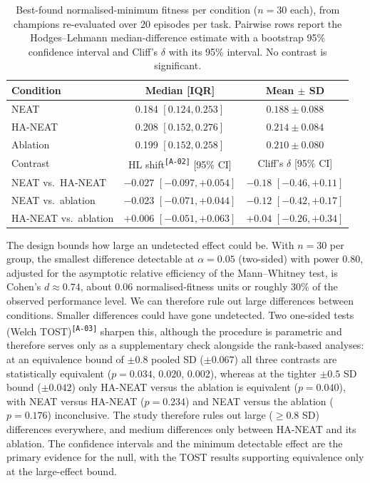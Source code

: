 \documentclass[12pt]{article}
\newcommand{\revID}[1]{\textsuperscript{\scriptsize\texttt{[#1]}}}
\newcommand{\revAcro}[2]{\textcolor{lrPurple}{#2}\revID{#1}}    %
\begin{document}
\begin{table}[h]
\centering
\caption{Best-found normalised-minimum fitness per condition ($n = 30$ each), from champions re-evaluated over 20 episodes per task. Pairwise rows report the Hodges--Lehmann median-difference estimate with a bootstrap 95\% confidence interval and Cliff's $\delta$ with its 95\% interval. No contrast is significant.}
\label{tab:main-fitness}
\begin{tabular}{lcc}
\toprule
Condition & Median [IQR] & Mean $\pm$ SD \\
\midrule
NEAT & 0.184 $[0.124, 0.253]$ & $0.188 \pm 0.088$ \\
HA-NEAT & 0.208 $[0.152, 0.276]$ & $0.214 \pm 0.084$ \\
Ablation & 0.199 $[0.152, 0.258]$ & $0.210 \pm 0.080$ \\
\midrule
Contrast & \revAcro{A-02}{HL shift} [95\% CI] & Cliff's $\delta$ [95\% CI] \\
\midrule
NEAT vs.\ HA-NEAT & $-0.027$ $[-0.097, +0.054]$ & $-0.18$ $[-0.46, +0.11]$ \\
NEAT vs.\ ablation & $-0.023$ $[-0.071, +0.044]$ & $-0.12$ $[-0.42, +0.17]$ \\
HA-NEAT vs.\ ablation & $+0.006$ $[-0.051, +0.063]$ & $+0.04$ $[-0.26, +0.34]$ \\
\bottomrule
\end{tabular}
\end{table}

The design bounds how large an undetected effect could be.
With $n = 30$ per group, the smallest difference detectable at $\alpha = 0.05$ (two-sided) with power 0.80, adjusted for the asymptotic relative efficiency of the Mann--Whitney test, is Cohen's $d \approx 0.74$, about 0.06 normalised-fitness units or roughly 30\% of the observed performance level.
We can therefore rule out large differences between conditions. Smaller differences could have gone undetected.
\revAcro{A-03}{Two one-sided tests (Welch TOST)} sharpen this, although the procedure is parametric and therefore serves only as a supplementary check alongside the rank-based analyses: at an equivalence bound of $\pm 0.8$ pooled SD ($\pm 0.067$) all three contrasts are statistically equivalent ($p = 0.034$, $0.020$, $0.002$), whereas at the tighter $\pm 0.5$ SD bound ($\pm 0.042$) only HA-NEAT versus the ablation is equivalent ($p = 0.040$), with NEAT versus HA-NEAT ($p = 0.234$) and NEAT versus the ablation ($p = 0.176$) inconclusive.
The study therefore rules out large ($\geq 0.8$ SD) differences everywhere, and medium differences only between HA-NEAT and its ablation. The confidence intervals and the minimum detectable effect are the primary evidence for the null, with the TOST results supporting equivalence only at the large-effect bound.
\end{document}
